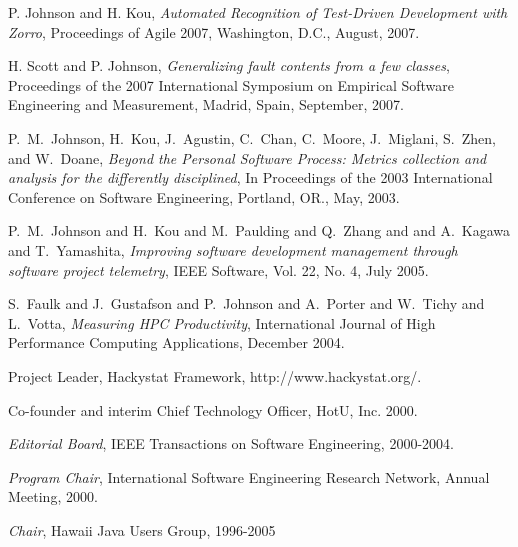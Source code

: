 \begin{Publications: Other Significant}

\item P. Johnson and H. Kou, {\em Automated Recognition of Test-Driven
    Development with Zorro}, Proceedings of Agile 2007, Washington, D.C.,
  August, 2007.

\item H. Scott and P. Johnson, {\em Generalizing fault contents from a few
classes}, Proceedings of the 2007 International Symposium on Empirical
Software Engineering and Measurement, Madrid, Spain, September, 2007.

\item P.~M.~Johnson, H.~Kou, J.~Agustin, C.~Chan, C.~Moore, 
J.~Miglani, S.~Zhen, and W.~Doane, {\em Beyond
the Personal Software Process: Metrics collection and analysis for the
differently disciplined}, In Proceedings of the 2003 International
Conference on Software Engineering, Portland, OR., May, 2003.

\item P.~M.~Johnson and H.~Kou and M.~Paulding and Q.~Zhang and
and A.~Kagawa and T.~Yamashita, {\em Improving software development
management through software project telemetry}, 
IEEE Software, Vol. 22, No. 4, July 2005.

\item S.~Faulk and J.~Gustafson and P.~Johnson and A.~Porter and W.~Tichy 
and L.~Votta, {\em Measuring {HPC} Productivity}, 
International Journal of High Performance Computing Applications, December 2004. 


\end{Publications: Other Significant}


\begin{Synergistic Activities}

\item {Project Leader}, Hackystat Framework, http://www.hackystat.org/.
\item {Co-founder and interim Chief Technology Officer}, HotU, Inc.  2000.
\item {\em Editorial Board}, IEEE Transactions on Software Engineering, 2000-2004.
\item {\em Program Chair}, International Software Engineering Research Network, Annual Meeting, 2000.
\item {\em Chair}, Hawaii Java Users Group, 1996-2005

\end{Synergistic Activities}


